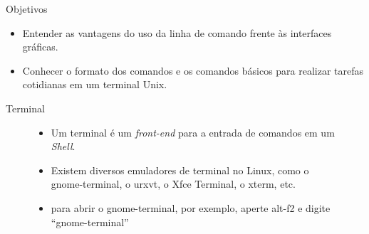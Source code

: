 \documentclass{beamer}
\begin{document}
\newcommand{\software}{\emph{software}\xspace}
\newcommand{\Software}{\emph{Software}\xspace}
\newcommand{\softwarelivre}{\Software Livre\xspace}
\newcommand{\opensource}{\emph{Open-Source}\xspace}
\newcommand{\Shell}{\emph{Shell}\xspace}

\gpsltitle{Aula 01:\\ \Shell}

\begin{frame}{Objetivos}
  \begin{itemize}
  \item Entender as vantagens do uso da linha de comando frente às interfaces
    gráficas.
  \item Conhecer o formato dos comandos e os comandos básicos para realizar
    tarefas cotidianas em um  terminal Unix.
  \end{itemize}
\end{frame}


\begin{frame}{Terminal}
  \begin{figure}[h]
    \centering
    \begin{itemize}
      \item Um terminal é um \emph{front-end} para a entrada de comandos em um
        \Shell.
      \item Existem diversos emuladores de terminal no Linux, como o
        gnome-terminal, o urxvt, o Xfce Terminal, o xterm, etc.
        \item para abrir o gnome-terminal, por exemplo, aperte alt-f2 e
          digite ``gnome-terminal''
          \vfill
          \begin{center}
          \begin{shell}
          \end{shell}
          \end{center}
      \end{itemize}
  \end{figure}
\end{frame}
\end{document}
